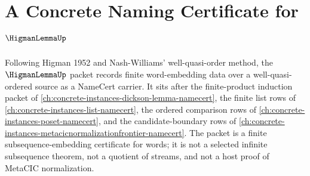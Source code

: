 \chapter{A Concrete Naming Certificate for $\HigmanLemmaUp$}
\label{ch:concrete-instances-higman-lemma-namecert}

Following Higman 1952 and Nash-Williams' well-quasi-order method, the $\HigmanLemmaUp$ packet records finite word-embedding data over a well-quasi-ordered source as a NameCert carrier. It sits after the finite-product induction packet of \autoref{ch:concrete-instances-dickson-lemma-namecert}, the finite list rows of \autoref{ch:concrete-instances-list-namecert}, the ordered comparison rows of \autoref{ch:concrete-instances-poset-namecert}, and the candidate-boundary rows of \autoref{ch:concrete-instances-metacicnormalizationfrontier-namecert}. The packet is a finite subsequence-embedding certificate for words; it is not a selected infinite subsequence theorem, not a quotient of streams, and not a host proof of MetaCIC normalization.

